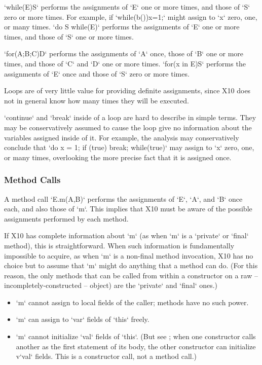 \xcd`while(E)S` performs the assignments of \xcd`E` one or more times, and
those of \xcd`S` zero or more times.  For example, if \xcd`while(b()){x=1;}`
might assign to \xcd`x` zero, one, or many times.  
\xcd`do S while(E)` performs the assignments of \xcd`E` one or more times, and
those of \xcd`S` one or more times. 

\xcd`for(A;B;C)D` performs the assignments of \xcd`A` once, those of \xcd`B`
one or more times, and those of \xcd`C` and \xcd`D` one or more times.
\xcd`for(x in E)S` performs the assignments of \xcd`E` once and those of
\xcd`S` zero or more times.  

Loops are of very little value for providing definite assignments, since X10
does not in general know how many times they will be executed. 

\xcd`continue` and \xcd`break` inside of a loop are hard to describe in simple
terms.  They may be conservatively assumed to cause the loop give no
information about the variables assigned inside of it.
For example, the analysis may conservatively conclude that 
\xcd`do{ x = 1; if (true) break; } while(true)` may 
assign to \xcd`x` zero, one, or many times, overlooking the more precise fact
that it is assigned once.  




\subsubsection{Method Calls}

A method call \xcd`E.m(A,B)` performs the assignments of \xcd`E`, \xcd`A`, and
\xcd`B` once each, and also those of \xcd`m`.  This implies that X10 must be
aware of the possible assignments performed by each method.


If X10 has complete information about \xcd`m` (as when \xcd`m` is a
\xcd`private` or \xcd`final` method), this is straightforward.  When such
information is fundamentally impossible to acquire, as when \xcd`m` is a
non-final method invocation, X10 has no choice but to assume that \xcd`m`
might do anything that a method can do.    (For this reason, the only methods
that can be called from within a constructor on a raw --
incompletely-constructed -- object) are the \xcd`private` and
\xcd`final` ones.)  
\begin{itemize}
\item \xcd`m` cannot assign to local fields of the caller; methods have no
      such power.
\item \xcd`m` can assign to \xcd`var` fields of \xcd`this` freely. 
\item \xcd`m` cannot initialize \xcd`val` fields of \xcd`this`.  (But see
      ; when one constructor calls another as the
      first statement of its body, the other constructor can initialize
      v\xcd`val` fields. This is a constructor call, not a method call.) 
\end{itemize}

